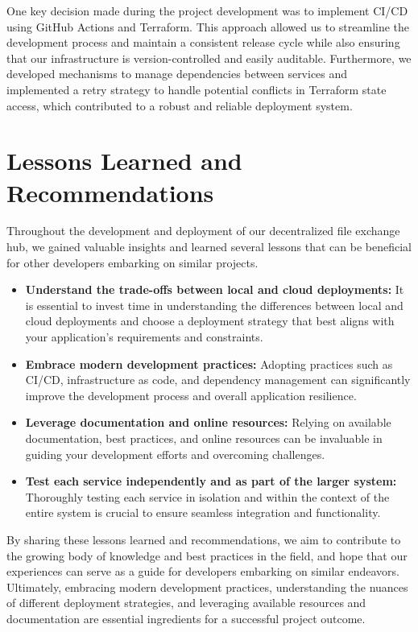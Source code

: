 \documentclass[a4paper,fleqn]{cas-dc}
\begin{document}
One key decision made during the project development was to implement CI/CD using GitHub Actions and Terraform. This approach allowed us to streamline the development process and maintain a consistent release cycle while also ensuring that our infrastructure is version-controlled and easily auditable. Furthermore, we developed mechanisms to manage dependencies between services and implemented a retry strategy to handle potential conflicts in Terraform state access, which contributed to a robust and reliable deployment system.

\section{Lessons Learned and Recommendations}

Throughout the development and deployment of our decentralized file exchange hub, we gained valuable insights and learned several lessons that can be beneficial for other developers embarking on similar projects.

\begin{itemize}
	\item \textbf{Understand the trade-offs between local and cloud deployments:} It is essential to invest time in understanding the differences between local and cloud deployments and choose a deployment strategy that best aligns with your application's requirements and constraints.
	\item \textbf{Embrace modern development practices:} Adopting practices such as CI/CD, infrastructure as code, and dependency management can significantly improve the development process and overall application resilience.
	\item \textbf{Leverage documentation and online resources:} Relying on available documentation, best practices, and online resources can be invaluable in guiding your development efforts and overcoming challenges.
	\item \textbf{Test each service independently and as part of the larger system:} Thoroughly testing each service in isolation and within the context of the entire system is crucial to ensure seamless integration and functionality.
\end{itemize}

By sharing these lessons learned and recommendations, we aim to contribute to the growing body of knowledge and best practices in the field, and hope that our experiences can serve as a guide for developers embarking on similar endeavors. Ultimately, embracing modern development practices, understanding the nuances of different deployment strategies, and leveraging available resources and documentation are essential ingredients for a successful project outcome.
\end{document}
